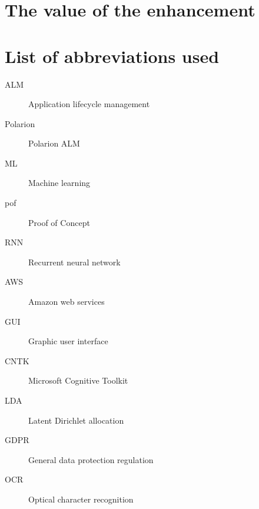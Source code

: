 \documentclass[thesis=M,english]{FITthesis}[2012/06/26]
\begin{document}
\chapter{The value of the enhancement}

\begin{conclusion}
\end{conclusion}




\appendix

\chapter{List of abbreviations used}

\printglossaries

\begin{description}
	\item[ALM] Application lifecycle management
	\item[Polarion] Polarion ALM
	\item[ML] Machine learning 
	\item[pof] Proof of Concept
	\item[RNN] Recurrent neural network
	\item[AWS] Amazon web services
	\item[GUI] Graphic user interface
	\item[CNTK] Microsoft Cognitive Toolkit
	\item[LDA] Latent Dirichlet allocation
	\item[GDPR] General data protection regulation
	\item[OCR] Optical character recognition	
\end{description}
\end{document}
